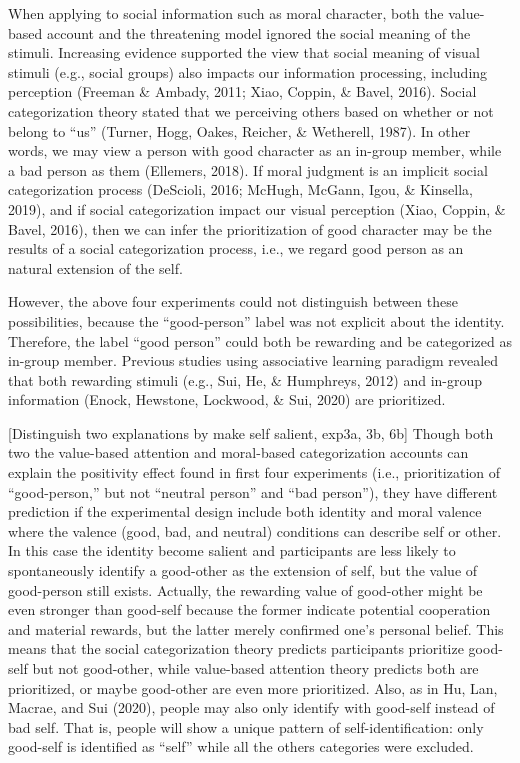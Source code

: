 \documentclass[
  english,
  man]{apa6}
\begin{document}
When applying to social information such as moral character, both the value-based account and the threatening model ignored the social meaning of the stimuli. Increasing evidence supported the view that social meaning of visual stimuli (e.g., social groups) also impacts our information processing, including perception (Freeman \& Ambady, 2011; Xiao, Coppin, \& Bavel, 2016). Social categorization theory stated that we perceiving others based on whether or not belong to ``us'' (Turner, Hogg, Oakes, Reicher, \& Wetherell, 1987). In other words, we may view a person with good character as an in-group member, while a bad person as them (Ellemers, 2018). If moral judgment is an implicit social categorization process (DeScioli, 2016; McHugh, McGann, Igou, \& Kinsella, 2019), and if social categorization impact our visual perception (Xiao, Coppin, \& Bavel, 2016), then we can infer the prioritization of good character may be the results of a social categorization process, i.e., we regard good person as an natural extension of the self.

However, the above four experiments could not distinguish between these possibilities, because the ``good-person'' label was not explicit about the identity. Therefore, the label ``good person'' could both be rewarding and be categorized as in-group member. Previous studies using associative learning paradigm revealed that both rewarding stimuli (e.g., Sui, He, \& Humphreys, 2012) and in-group information (Enock, Hewstone, Lockwood, \& Sui, 2020) are prioritized.

{[}Distinguish two explanations by make self salient, exp3a, 3b, 6b{]}
Though both two the value-based attention and moral-based categorization accounts can explain the positivity effect found in first four experiments (i.e., prioritization of ``good-person,'' but not ``neutral person'' and ``bad person''), they have different prediction if the experimental design include both identity and moral valence where the valence (good, bad, and neutral) conditions can describe self or other. In this case the identity become salient and participants are less likely to spontaneously identify a good-other as the extension of self, but the value of good-person still exists. Actually, the rewarding value of good-other might be even stronger than good-self because the former indicate potential cooperation and material rewards, but the latter merely confirmed one's personal belief. This means that the social categorization theory predicts participants prioritize good-self but not good-other, while value-based attention theory predicts both are prioritized, or maybe good-other are even more prioritized. Also, as in Hu, Lan, Macrae, and Sui (2020), people may also only identify with good-self instead of bad self. That is, people will show a unique pattern of self-identification: only good-self is identified as ``self'' while all the others categories were excluded.
\end{document}
